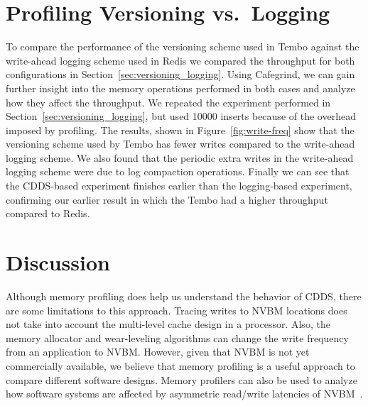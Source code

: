 \section{Profiling Versioning vs.\ Logging}
To compare the performance of the versioning scheme used in Tembo against the
write-ahead logging scheme used in Redis we compared the throughput for both
configurations in Section~\ref{sec:versioning_logging}. Using Cafegrind, we can
gain further insight into the memory operations performed in both cases and
analyze how they affect the throughput. We repeated the experiment performed
in Section~\ref{sec:versioning_logging}, but used 10000 inserts because of the
overhead imposed by profiling. The results, shown in
Figure~\ref{fig:write-freq} show that the versioning scheme used by Tembo has
fewer writes compared to the write-ahead logging scheme. We also found that the
periodic extra writes in the write-ahead logging scheme were due to log
compaction operations. Finally we can see that the CDDS-based experiment
finishes earlier than the logging-based experiment, confirming our earlier
result in which the Tembo had a higher throughput compared to Redis.

\section{Discussion}
Although memory profiling does help us understand the behavior of CDDS, there are
some limitations to this approach. Tracing writes to NVBM locations does not 
take into account the multi-level cache design in a processor. Also, the memory
allocator and wear-leveling algorithms can change the write frequency from an
application to NVBM. However, given that NVBM is not yet commercially available,
we believe that memory profiling is a useful approach to compare different
software designs. Memory profilers can also be used to analyze how software 
systems are affected by asymmetric read/write latencies of NVBM~\cite{Qureshi10}. 

